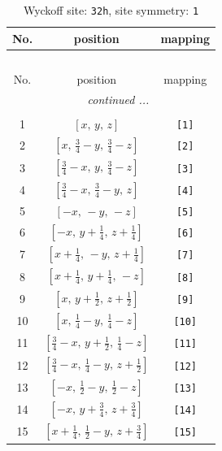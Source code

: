 \documentclass[fleqn,8pt]{jsarticle}
\begin{document}
\renewcommand{\arraystretch}{1.2}
\begin{longtable}{ccc}
\caption{Wyckoff site: {\tt 32h}, site symmetry: {\tt 1}}
 \\
 \hline \hline
No. & position & mapping \\ \hline \endfirsthead

\multicolumn{2}{l}{\tablename\ \thetable{}} \\
 \hline \hline
No. & position & mapping \\ \hline \endhead

 \hline \hline
\multicolumn{2}{r}{\footnotesize\it continued ...} \\ \endfoot

 \hline \hline
\multicolumn{2}{r}{} \\ \endlastfoot

1 & $\left[ x,\, y,\, z \right]$ & {\tt [1]} \\ \hline
2 & $\left[ x,\, \frac{3}{4} - y,\, \frac{3}{4} - z \right]$ & {\tt [2]} \\ \hline
3 & $\left[ \frac{3}{4} - x,\, y,\, \frac{3}{4} - z \right]$ & {\tt [3]} \\ \hline
4 & $\left[ \frac{3}{4} - x,\, \frac{3}{4} - y,\, z \right]$ & {\tt [4]} \\ \hline
5 & $\left[ - x,\, - y,\, - z \right]$ & {\tt [5]} \\ \hline
6 & $\left[ - x,\, y + \frac{1}{4},\, z + \frac{1}{4} \right]$ & {\tt [6]} \\ \hline
7 & $\left[ x + \frac{1}{4},\, - y,\, z + \frac{1}{4} \right]$ & {\tt [7]} \\ \hline
8 & $\left[ x + \frac{1}{4},\, y + \frac{1}{4},\, - z \right]$ & {\tt [8]} \\ \hline
9 & $\left[ x,\, y + \frac{1}{2},\, z + \frac{1}{2} \right]$ & {\tt [9]} \\ \hline
10 & $\left[ x,\, \frac{1}{4} - y,\, \frac{1}{4} - z \right]$ & {\tt [10]} \\ \hline
11 & $\left[ \frac{3}{4} - x,\, y + \frac{1}{2},\, \frac{1}{4} - z \right]$ & {\tt [11]} \\ \hline
12 & $\left[ \frac{3}{4} - x,\, \frac{1}{4} - y,\, z + \frac{1}{2} \right]$ & {\tt [12]} \\ \hline
13 & $\left[ - x,\, \frac{1}{2} - y,\, \frac{1}{2} - z \right]$ & {\tt [13]} \\ \hline
14 & $\left[ - x,\, y + \frac{3}{4},\, z + \frac{3}{4} \right]$ & {\tt [14]} \\ \hline
15 & $\left[ x + \frac{1}{4},\, \frac{1}{2} - y,\, z + \frac{3}{4} \right]$ & {\tt [15]} \\ \hline

\end{longtable}
\end{document}
